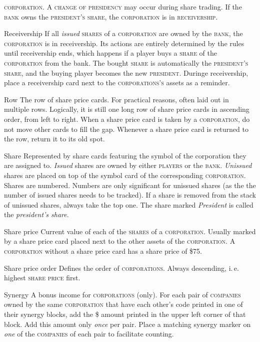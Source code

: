\documentclass[11pt,a4paper]{article}
\newenvironment{my_description}
  {\begin{list}{}{\setlength{\labelwidth}{0pt}
   \leftmargin=1.2em
   \setlength{\itemindent}{-\leftmargin}
   \renewcommand{\makelabel}{\descriptionlabel}}
  \setlength{\itemsep}{1pt}
  \setlength{\parskip}{0pt}
  \setlength{\parsep}{0pt}
  }
  {\end{list}}
\begin{document}
\begin{multicols}{2}
{\begin{my_description}
  \textsc{corporation}. A \textsc{change of presidency} may occur
  during share trading. If the \textsc{bank} owns the \textsc{president's}
  \textsc{share}, the \textsc{corporation} is in
  \textsc{receivership}.
\item[Receivership] If all \emph{issued} \textsc{shares} of a
  \textsc{corporation} are owned by the \textsc{bank}, the
  \textsc{corporation} is in receivership. Its actions are entirely
  determined by the rules until receivership ends, which happens if a
  player buys a \textsc{share} of the \textsc{corporation} from the
  bank. The bought \textsc{share} is automatically the \textsc{president's}
  \textsc{share}, and the buying player becomes the new
  \textsc{president}. Duringe receivership, place a receivership card
  next to the \textsc{corporations's} assets as a reminder.
\item[Row] The row of share price cards. For practical reasons, often
  laid out in multiple rows. Logically, it is still one long row of
  share price cards in ascending order, from left to right. When a
  share price card is taken by a \textsc{corporation}, do not move
  other cards to fill the gap. Whenever a share price card is
  returned to the row, return it to its old spot.
\item[Share] Represented by share cards featuring the symbol of the
  corporation they are assigned to. \emph{Issued} shares are owned by
  either \textsc{players} or the \textsc{bank}. \emph{Unissued} shares
  are placed on top of the symbol card of the corresponding
  \textsc{corporation}. Shares are numbered. Numbers are only
  significant for unissued shares (as the the number of issued shares
  needs to be tracked). If a share is removed from the stack of
  unissued shares, always take the top one. The share marked
  \emph{President} is called the \emph{president's share}.
\item[Share price] Current value of each of the \textsc{shares} of a
  \textsc{corporation}. Usually marked by a share price card placed
  next to the other assets of the \textsc{corporation}. A
  \textsc{corporation} without a share price card has a share price of
  \$75.
\item[Share price order] Defines the order of
  \textsc{corporations}. Always descending, i.\,e. highest
  \textsc{share price} first.
\item[Synergy] A bonus income for \textsc{corporations} (only). For
  each pair of \textsc{companies} owned by the same
  \textsc{corporation} that have each other's code printed in one of
  their synergy blocks, add the \$ amount printed in the upper left
  corner of that block. Add this amount only \emph{once} per
  pair. Place a matching synergy marker on \emph{one} of the
  \textsc{companies} of each pair to facilitate counting.
\end{my_description}

}
\end{multicols}
\end{document}
